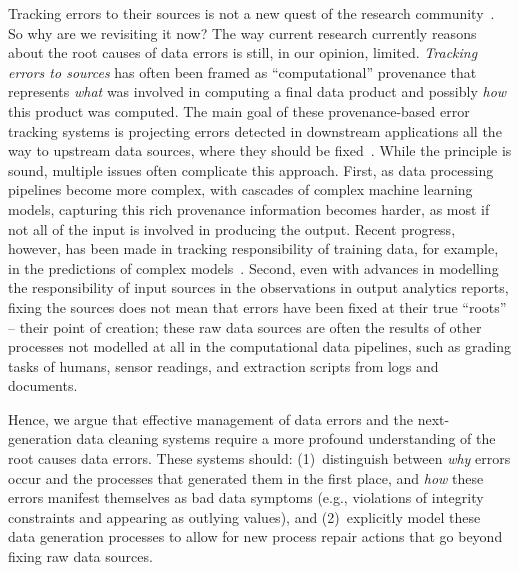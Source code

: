 \documentclass[11pt]{article}
\begin{document}
Tracking errors to their sources is not a new quest of the research community~\cite{DBLP:conf/sigmod/ChalamallaIOP14, DBLP:conf/sigmod/WangM017, DBLP:journals/ftdb/GlavicMR21}. So why are we revisiting it now? %
The way current research currently reasons about the root causes of data errors is still, in our opinion, limited. \emph{Tracking errors to sources} has often been framed as  ``computational'' provenance that represents \emph{what} was involved in computing a final data product and possibly \emph{how} this product was computed. The main goal of these provenance-based error tracking systems is projecting errors detected in downstream applications all the way to upstream data sources, where they should be fixed~\cite{DBLP:conf/sigmod/ChalamallaIOP14}.  While the principle is sound, multiple issues often complicate this approach. First, as data processing pipelines become more complex, with cascades of complex machine learning models, capturing this rich provenance information becomes harder, as most if not all of the input is involved in producing the output. Recent progress, however, has been made in tracking responsibility of training data, for example, in the predictions of complex models~\cite{DBLP:journals/corr/abs-2002-08484,pmlr-koh-Liang,DBLP:journals/corr/abs-2202-00622}. Second, even with advances in modelling the responsibility of input sources in the observations in output analytics reports, fixing the sources does not mean that errors have been fixed at their true ``roots'' -- their point of creation; these raw data sources are often the results of other processes not modelled at all in the computational data pipelines, such as grading tasks of humans, sensor readings, and extraction scripts from logs and documents.  

Hence, we argue that effective management of data errors and the next-generation data cleaning systems require a more profound understanding of the root causes data errors. These systems should: (1)~distinguish between \emph{why} errors occur and the processes that generated them in the first place, and \emph{how}  these errors manifest themselves as bad data symptoms (e.g., violations of integrity constraints and appearing as outlying values), and (2)~explicitly model these data generation processes to allow for new process repair actions that go beyond fixing raw data sources. 
\end{document}
